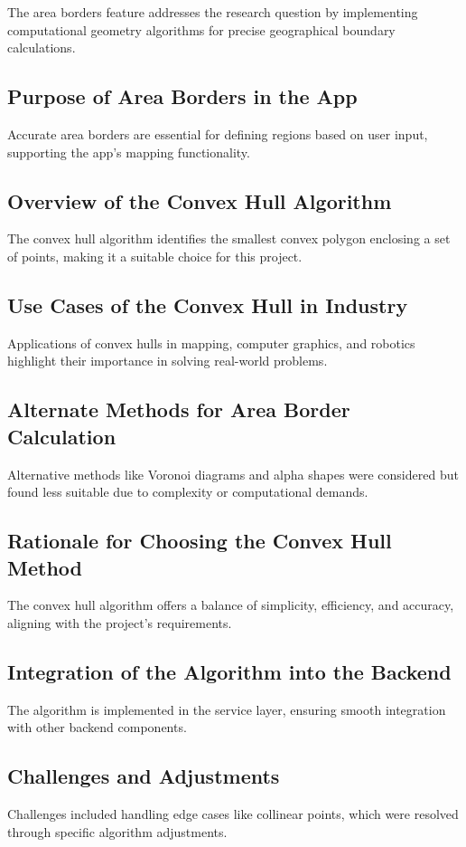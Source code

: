 \Author{\daAuthorThree}

    The area borders feature addresses the research question by implementing computational geometry algorithms for precise geographical boundary calculations.

    \subsection{Purpose of Area Borders in the App}
    Accurate area borders are essential for defining regions based on user input, supporting the app's mapping functionality.

    \subsection{Overview of the Convex Hull Algorithm}
    The convex hull algorithm identifies the smallest convex polygon enclosing a set of points, making it a suitable choice for this project.

    \subsection{Use Cases of the Convex Hull in Industry}
    Applications of convex hulls in mapping, computer graphics, and robotics highlight their importance in solving real-world problems.

    \subsection{Alternate Methods for Area Border Calculation}
    Alternative methods like Voronoi diagrams and alpha shapes were considered but found less suitable due to complexity or computational demands.

    \subsection{Rationale for Choosing the Convex Hull Method}
    The convex hull algorithm offers a balance of simplicity, efficiency, and accuracy, aligning with the project's requirements.

    \subsection{Integration of the Algorithm into the Backend}
    The algorithm is implemented in the service layer, ensuring smooth integration with other backend components.

    \subsection{Challenges and Adjustments}
    Challenges included handling edge cases like collinear points, which were resolved through specific algorithm adjustments.
